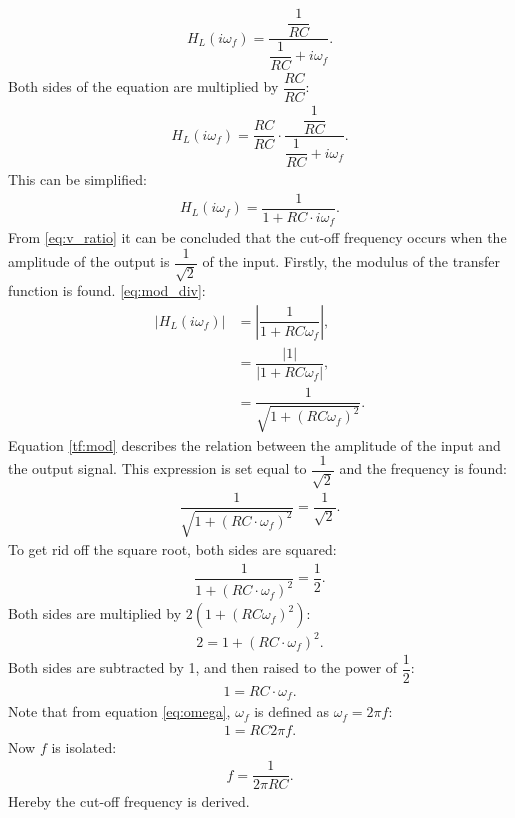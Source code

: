 \begin{align} \label{eq:trans_low}
H_{L}(i \omega_f) = \dfrac{\dfrac{1}{RC}}{\dfrac{1}{RC}+i \omega_f}. 
\end{align}
Both sides of the equation are multiplied by $\dfrac{RC}{RC}$:
\begin{align*}
H_{L}(i \omega_f) = \dfrac{RC}{RC} \cdot \dfrac{\dfrac{1}{RC}}{\dfrac{1}{RC}+i \omega_f}. 
\end{align*}
This can be simplified:
\begin{align*}
H_{L}(i \omega_f) =  \dfrac{1}{1+RC \cdot i \omega_f}. 
\end{align*}
From \eqref{eq:v_ratio} it can be concluded that the cut-off frequency occurs when the amplitude of the output is $\dfrac{1}{\sqrt{2}}$ of the input. Firstly, the modulus of the transfer function is found.
\eqref{eq:mod_div}:
\begin{align}
\left|H_{L}(i \omega_f) \right| &=  \left|\dfrac{1}{1+RC \omega_f} \right|, \nonumber
\\
&=\dfrac{|1|}{|1+RC\omega_f |}, \nonumber
\\
&=  \dfrac{1}{\sqrt{1+(RC \omega_f)^2}}. \label{tf:mod}
\end{align}
Equation \eqref{tf:mod} describes the relation between the amplitude of the input and the output signal. This expression is set equal to $\dfrac{1}{\sqrt{2}}$ and the frequency is found:
\\
\begin{align*}
\dfrac{1}{\sqrt{1+ \left(RC \cdot \omega_f \right)^2}} = \dfrac{1}{\sqrt{2}}.
\end{align*}
To get rid off the square root, both sides are squared:
\begin{align*}
\dfrac{1}{1+ \left(RC \cdot \omega_f \right)^2} = \dfrac{1}{2}.
\end{align*}
	Both sides are multiplied by $2(1+(RC\omega_f)^2)$:
\begin{align*}
2 = 1+ \left(RC \cdot \omega_f \right)^2.
\end{align*}
Both sides are subtracted by 1, and then raised to the power of $\dfrac{1}{2}$:
\begin{align*}
1 = RC \cdot \omega_f .
\end{align*}
Note that from equation \eqref{eq:omega}, $\omega_f$ is defined as $\omega_f=2 \pi f$:
\begin{align*}
1 = RC 2\pi f .
\end{align*}
Now $f$ is isolated:
\begin{align*}
f=\dfrac{1}{2\pi RC}.
\end{align*}
Hereby the cut-off frequency is derived.

